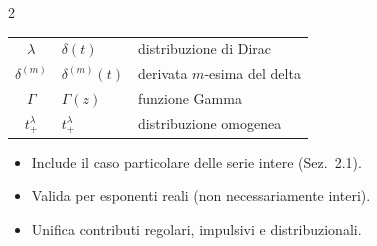 \documentclass[a3paper, 12pt]{article}
\newcommand{\sectionnum}[1]{%
  \tikz[baseline=-0.5ex]\node[fill=accentBlue, text=white,
    font=\bfseries\small, inner sep=3pt, rounded corners=2pt]{#1};%
}
\newcommand{\checkitem}{\textcolor{accentGreen}{\textbullet}\;}
\begin{document}
\begin{multicols}{2}
\begin{tcolorbox}[sectionbox,
  title={\sectionnum{2.2}\quad ESTENSIONE GENERALE}]
\end{tcolorbox}

\columnbreak   %

\begin{tcolorbox}[goldbox, title={NOTAZIONE}]
\renewcommand{\arraystretch}{1.4}
\begin{tabular}{@{}cl@{\quad}l@{}}
  \textcolor{accentGold}{\small$\lambda$} &
    $\delta(t)$       & distribuzione di Dirac \\
  \textcolor{accentGold}{\small$\delta^{(m)}$} &
    $\delta^{(m)}(t)$ & derivata $m$-esima del delta \\
  \textcolor{accentGold}{\small$\Gamma$} &
    $\Gamma(z)$       & funzione Gamma \\
  \textcolor{accentGold}{\small$t_+^\lambda$} &
    $t_+^\lambda$     & distribuzione omogenea \\
\end{tabular}
\end{tcolorbox}

\vspace{0.3cm}

\begin{tcolorbox}[notebox, title={\color{accentGold}\bfseries OSSERVAZIONI}]
\begin{itemize}[leftmargin=*, itemsep=2pt]
  \item[\checkitem] Include il caso particolare delle serie intere (Sez.\ 2.1).
  \item[\checkitem] Valida per esponenti reali (non necessariamente interi).
  \item[\checkitem] Unifica contributi regolari, impulsivi e distribuzionali.
\end{itemize}
\end{tcolorbox}

\end{multicols}

\vspace{0.4cm}
\end{document}
